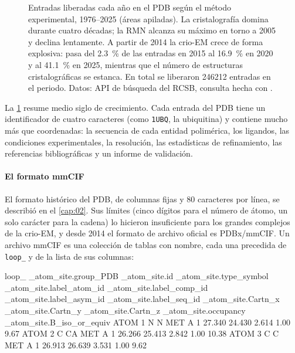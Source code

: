 \begin{figure}[t]
\centering
{}
\caption[Crecimiento del PDB por método]{Entradas liberadas cada año en el PDB según el método experimental, 1976--2025 (áreas apiladas). La cristalografía domina durante cuatro décadas; la RMN alcanza su máximo en torno a 2005 y declina lentamente. A partir de 2014 la crio-EM crece de forma explosiva: pasa del \SI{2,3}{\percent} de las entradas en 2015 al \SI{16,9}{\percent} en 2020 y al \SI{41,1}{\percent} en 2025, mientras que el número de estructuras cristalográficas se estanca. En total se liberaron \num{246212} entradas en el periodo. Datos: API de búsqueda del RCSB, consulta hecha con .}
\label{fig:15-pdb}
\end{figure}

La \cref{fig:15-pdb} resume medio siglo de crecimiento. Cada entrada del PDB tiene un identificador de cuatro caracteres (como \texttt{1UBQ}, la ubiquitina) y contiene mucho más que coordenadas: la secuencia de cada entidad polimérica, los ligandos, las condiciones experimentales, la resolución, las estadísticas de refinamiento, las referencias bibliográficas y un informe de validación.

\paragraph{El formato mmCIF} El formato histórico del PDB, de columnas fijas y 80 caracteres por línea, se describió en el \cref{cap:02}. Sus límites (cinco dígitos para el número de átomo, un solo carácter para la cadena) lo hicieron insuficiente para los grandes complejos de la crio-EM, y desde 2014 el formato de archivo oficial es PDBx/mmCIF. Un archivo mmCIF es una colección de tablas con nombre, cada una precedida de \texttt{loop\_} y de la lista de sus columnas:

\begin{consola}
loop_
_atom_site.group_PDB
_atom_site.id
_atom_site.type_symbol
_atom_site.label_atom_id
_atom_site.label_comp_id
_atom_site.label_asym_id
_atom_site.label_seq_id
_atom_site.Cartn_x
_atom_site.Cartn_y
_atom_site.Cartn_z
_atom_site.occupancy
_atom_site.B_iso_or_equiv
ATOM 1 N N   MET A 1 27.340 24.430 2.614 1.00  9.67
ATOM 2 C CA  MET A 1 26.266 25.413 2.842 1.00 10.38
ATOM 3 C C   MET A 1 26.913 26.639 3.531 1.00  9.62
\end{consola}


